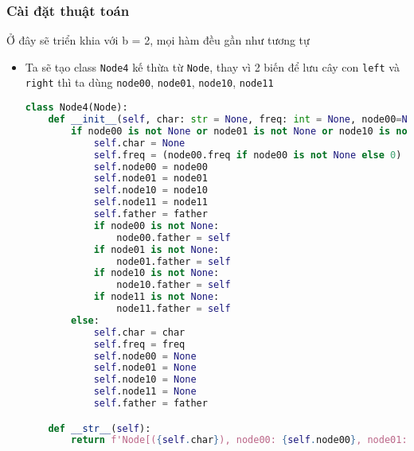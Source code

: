 \subsubsection{Cài đặt thuật toán}
Ở đây sẽ triển khia với b = 2, mọi hàm đều gần như tương tự 
\begin{itemize}
    \item Ta sẽ tạo class \lstinline{Node4} kế thừa từ \lstinline{Node}, thay vì 2 biến để lưu cây con \lstinline{left} và \lstinline{right} thì ta dùng \lstinline{node00}, \lstinline{node01}, \lstinline{node10}, \lstinline{node11}
\begin{lstlisting}[language=Python]
class Node4(Node):
    def __init__(self, char: str = None, freq: int = None, node00=None, node01=None, node10=None, node11=None, father=None):
        if node00 is not None or node01 is not None or node10 is not None or node11 is not None:
            self.char = None
            self.freq = (node00.freq if node00 is not None else 0) + (node01.freq if node01 is not None else 0) + (node10.freq if node10 is not None else 0) + (node11.freq if node11 is not None else 0)
            self.node00 = node00
            self.node01 = node01
            self.node10 = node10
            self.node11 = node11
            self.father = father
            if node00 is not None:
                node00.father = self
            if node01 is not None:
                node01.father = self
            if node10 is not None:
                node10.father = self
            if node11 is not None:
                node11.father = self
        else:
            self.char = char
            self.freq = freq
            self.node00 = None
            self.node01 = None
            self.node10 = None
            self.node11 = None
            self.father = father

    def __str__(self):
        return f'Node[({self.char}), node00: {self.node00}, node01: {self.node01}, node10: {self.node10}, node11: {self.node11}]'


\end{lstlisting}
\end{itemize}
